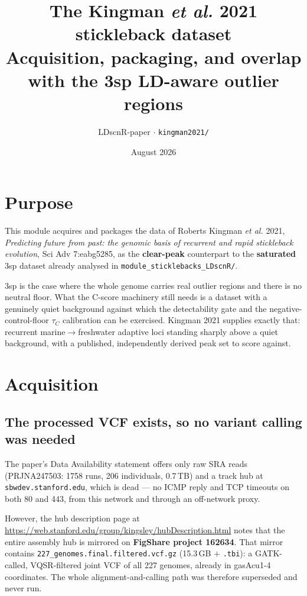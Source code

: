 \documentclass[11pt,a4paper]{article}
\title{\vspace{-1.5cm}\textbf{The Kingman \textit{et al.} 2021 stickleback dataset}\\[2pt]
\large Acquisition, packaging, and overlap with the 3sp LD-aware outlier regions}
\author{LDscnR-paper $\cdot$ \texttt{kingman2021/}}
\date{August 2026}
\begin{document}
\maketitle

\section{Purpose}

This module acquires and packages the data of Roberts Kingman \textit{et al.} 2021,
\textit{Predicting future from past: the genomic basis of recurrent and rapid stickleback
evolution}, Sci Adv 7:eabg5285, as the \textbf{clear-peak} counterpart to the
\textbf{saturated} 3sp dataset already analysed in \texttt{module\_sticklebacks\_LDscnR/}.

3sp is the case where the whole genome carries real outlier regions and there is no
neutral floor. What the C-score machinery still needs is a dataset with a genuinely quiet
background against which the detectability gate and the negative-control-floor
$\tau_C$ calibration can be exercised. Kingman 2021 supplies exactly that: recurrent
marine$\rightarrow$freshwater adaptive loci standing sharply above a quiet background,
with a published, independently derived peak set to score against.

\section{Acquisition}

\subsection{The processed VCF exists, so no variant calling was needed}

The paper's Data Availability statement offers only raw SRA reads
(PRJNA247503: 1758 runs, 206 individuals, 0.7\,TB) and a track hub at
\texttt{sbwdev.stanford.edu}, which is dead --- no ICMP reply and TCP timeouts on both 80
and 443, from this network and through an off-network proxy.

However, the hub description page at
\url{https://web.stanford.edu/group/kingsley/hubDescription.html} notes that the entire
assembly hub is mirrored on \textbf{FigShare project 162634}. That mirror contains
\texttt{227\_genomes.final.filtered.vcf.gz} (15.3\,GB $+$ \texttt{.tbi}): a GATK-called,
VQSR-filtered joint VCF of all 227 genomes, already in gasAcu1-4 coordinates. The whole
alignment-and-calling path was therefore superseded and never run.
\end{document}

